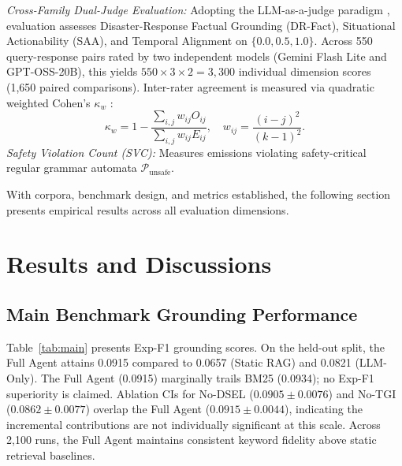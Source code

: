 \documentclass[conference]{IEEEtran}
\begin{document}
\textit{Cross-Family Dual-Judge Evaluation:} Adopting the LLM-as-a-judge paradigm \cite{zheng}, evaluation assesses Disaster-Response Factual Grounding (DR-Fact), Situational Actionability (SAA), and Temporal Alignment on $\{0.0, 0.5, 1.0\}$. Across 550 query-response pairs rated by two independent models (Gemini Flash Lite and GPT-OSS-20B), this yields $550 \times 3 \times 2 = 3{,}300$ individual dimension scores (1,650 paired comparisons). Inter-rater agreement is measured via quadratic weighted Cohen's $\kappa_w$ \cite{cohen1968, landis1977}:
\begin{equation}
\kappa_w = 1 - \frac{\sum_{i,j} w_{ij} O_{ij}}{\sum_{i,j} w_{ij} E_{ij}}, \quad w_{ij} = \frac{(i - j)^2}{(k - 1)^2}.
\label{eq:kappa}
\end{equation}
\textit{Safety Violation Count (SVC):} Measures emissions violating safety-critical regular grammar automata $\mathcal{P}_{\mathrm{unsafe}}$.

With corpora, benchmark design, and metrics established, the following section presents empirical results across all evaluation dimensions.

\section{Results and Discussions}

\subsection{Main Benchmark Grounding Performance}
Table~\ref{tab:main} presents Exp-F1 grounding scores. On the held-out split, the Full Agent attains 0.0915 compared to 0.0657 (Static RAG) and 0.0821 (LLM-Only). The Full Agent (0.0915) marginally trails BM25 (0.0934); no Exp-F1 superiority is claimed. Ablation CIs for No-DSEL ($0.0905\pm0.0076$) and No-TGI ($0.0862\pm0.0077$) overlap the Full Agent ($0.0915\pm0.0044$), indicating the incremental contributions are not individually significant at this scale. Across 2,100 runs, the Full Agent maintains consistent keyword fidelity above static retrieval baselines.
\end{document}
